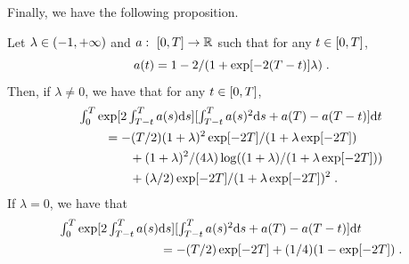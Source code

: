   Finally, we have the following proposition.

  \begin{proposition}
    \label{prop:expression_fat_2}
      Let $\lambda \in \left(-1, +\infty\right)$ and $a: \ \left[0,T\right] \to \mathbb{R}$ such
  that for any $t \in \left[0,T\right]$,
  \begin{equation}
    a(t) = 1 - 2/(1 + \exp[-2(T-t)]\lambda) \; . 
  \end{equation}
  Then, if $\lambda \neq 0$, we have that for any $t \in \left[0,T\right]$,
  \begin{align}
  &\textstyle{\int_0^T \exp[2\int_{T-t}^T a(s) \mathrm{d}s] [\int_{T-t}^T a(s)^2 \mathrm{d}s + a(T) - a(T-t)] \mathrm{d}t } \\
  & \qquad = - (T/2)(1+\lambda)^2\exp[-2T]/(1+\lambda\exp[-2T]) \\
   & \qquad \qquad + (1+\lambda)^2/(4\lambda)\log((1+\lambda)/(1 + \lambda \exp[-2T])) \\
    & \qquad \qquad + (\lambda/2) \exp[-2T]/(1 + \lambda \exp[-2T])^2 \; .
  \end{align}
  If $\lambda = 0$, we have that
  \begin{align}
    &\textstyle{\int_0^T \exp[2\int_{T-t}^T a(s) \mathrm{d}s] [\int_{T-t}^T a(s)^2 \mathrm{d}s + a(T) - a(T-t)] \mathrm{d}t } \\
    & \qquad \qquad  \qquad \qquad = -(T/2)\exp[-2T] + (1/4)(1 - \exp[-2T]) \; . 
  \end{align}

  \end{proposition}

